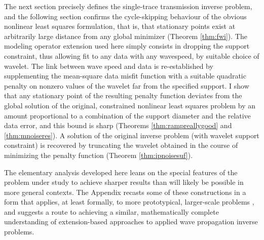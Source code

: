 The next section precisely defines the single-trace transmission
inverse problem, and the following section confirms the
cycle-skipping behaviour of the obvious nonlinear least squares
formulation, that is, that stationary points exist at arbitrarily
large distance from any global minimizer (Theorem \ref{thm:fwi}). The
modeling operator extension used here simply consists in dropping the
support constraint, thus allowing fit to any data with any wavespeed,
by suitable choice of wavelet. The link between wave speed and data is
re-established by supplementing the mean-square data misfit function
with a suitable quadratic penalty on nonzero values of the wavelet far
from the specified support. I show that any stationary point of the
resulting penalty function deviates from the global solution of the
original, constrained nonlinear least squares problem by an amount
proportional to a combination of the support diameter and the relative
data error, and this bound is sharp
(Theorems \ref{thm:rampreallygood} and \ref{thm:mnoiseres}). A
solution of the original inverse problem (with wavelet support
constraint) is recovered by truncating the wavelet obtained in the
course of minimizing the penalty function (Theorem
\ref{thm:ipnoisesuf}).

The elementary
analysis developed here leans on the special features of the problem
under study to achieve sharper results than will likely be possible in
more general contexts. The Appendix recasts some of these
constructions in a form that applies, at least formally, to more
prototypical, larger-scale problems
\cite[]{Symes:IPTA14,tenKroode:IPTA14}, and suggests a route to
achieving a similar, mathematically complete understanding of
extension-based approaches to applied wave propagation inverse
problems.

